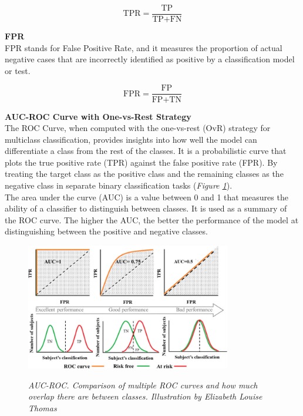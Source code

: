 \[
\text{TPR} = \frac{\text{TP}}{\text{TP} + \text{FN}}
\]

\vspace{0.5cm}
\textbf{FPR} \\

FPR stands for False Positive Rate, and it measures the proportion of actual negative cases that are incorrectly identified as positive by a classification model or test.

\[
\text{FPR} = \frac{\text{FP}}{\text{FP} + \text{TN}}
\]

\vspace{0.5cm}
\textbf{AUC-ROC Curve with One-vs-Rest Strategy} \\

The ROC Curve, when computed with the one-vs-rest (OvR) strategy for multiclass classification, provides insights into how well the model can differentiate a class from the rest of the classes. It is a probabilistic curve that plots the true positive rate (TPR) against the false positive rate (FPR). By treating the target class as the positive class and the remaining classes as the negative class in separate binary classification tasks (\textit{Figure \ref{fig:auc-roc}}). \\

The area under the curve (AUC) is a value between 0 and 1 that measures
the ability of a classifier to distinguish between classes. It is used as a summary
of the ROC curve. The higher the AUC, the better the performance of the
model at distinguishing between the positive and negative classes.

\begin{figure}[H]
\centering
\includegraphics[width=0.8\textwidth]{imatges/preliminaries/auc.png}
    \caption[Forward Propagation and Backward Propagation]{\textit{AUC-ROC. Comparison of multiple ROC curves and how much overlap there are between classes. Illustration by Elizabeth Louise Thomas}}
{\label{fig:auc-roc}}
\end{figure}


